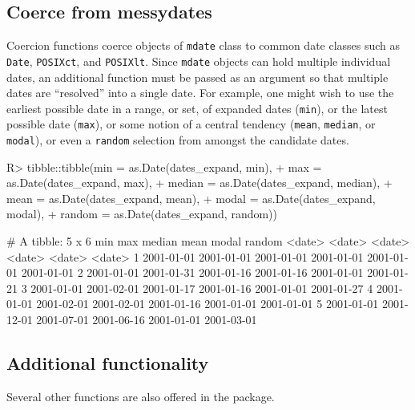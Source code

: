 \documentclass[
]{jss}
\begin{document}
\hypertarget{coerce-from-messydates}{%
\subsection{Coerce from messydates}\label{coerce-from-messydates}}

Coercion functions coerce objects of \texttt{mdate} class to common date
classes such as \texttt{Date}, \texttt{POSIXct}, and \texttt{POSIXlt}.
Since \texttt{mdate} objects can hold multiple individual dates, an
additional function must be passed as an argument so that multiple dates
are ``resolved'' into a single date. For example, one might wish to use
the earliest possible date in a range, or set, of expanded dates
(\texttt{min}), or the latest possible date (\texttt{max}), or some
notion of a central tendency (\texttt{mean}, \texttt{median}, or
\texttt{modal}), or even a \texttt{random} selection from amongst the
candidate dates.

\begin{CodeChunk}
\begin{CodeInput}
R> tibble::tibble(min = as.Date(dates_expand, min),
+                max = as.Date(dates_expand, max),
+                median = as.Date(dates_expand, median),
+                mean = as.Date(dates_expand, mean),
+                modal = as.Date(dates_expand, modal),
+                random = as.Date(dates_expand, random))
\end{CodeInput}
\begin{CodeOutput}
# A tibble: 5 x 6
  min        max        median     mean       modal      random    
  <date>     <date>     <date>     <date>     <date>     <date>    
1 2001-01-01 2001-01-01 2001-01-01 2001-01-01 2001-01-01 2001-01-01
2 2001-01-01 2001-01-31 2001-01-16 2001-01-16 2001-01-01 2001-01-21
3 2001-01-01 2001-02-01 2001-01-17 2001-01-16 2001-01-01 2001-01-27
4 2001-01-01 2001-02-01 2001-02-01 2001-01-16 2001-01-01 2001-01-01
5 2001-01-01 2001-12-01 2001-07-01 2001-06-16 2001-01-01 2001-03-01
\end{CodeOutput}
\end{CodeChunk}

\hypertarget{additional-functionality}{%
\subsection{Additional functionality}\label{additional-functionality}}

Several other functions are also offered in the 
package.
\end{document}
